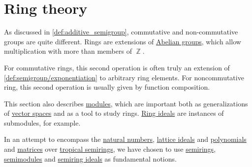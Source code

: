 \chapter{Ring theory}\label{ch:ring_theory}

As discussed in \cref{def:additive_semigroup}, commutative and non-commutative groups are quite different. Rings are extensions of \hyperref[def:abelian_group]{Abelian groups}, which allow multiplication with more than members of \( \BbbZ \).

For commutative rings, this second operation is often truly an extension of \cref{def:semigroup/exponentiation} to arbitrary ring elements. For noncommutative ring, this second operation is usually given by function composition.

This section also describes \hyperref[def:module]{modules}, which are important both as generalizations of \hyperref[def:vector_space]{vector spaces} and as a tool to study rings. \hyperref[def:semiring_ideal]{Ring ideals} are instances of submodules, for example.

In an attempt to encompass the \hyperref[def:natural_numbers]{natural numbers}, \hyperref[def:lattice_ideal]{lattice ideals} and \hyperref[def:polynomial_algebra]{polynomials} and \hyperref[def:array/matrix]{matrices} over \hyperref[def:tropical_semiring]{tropical semirings}, we have chosen to use \hyperref[def:semiring]{semirings}, \hyperref[def:semimodule]{semimodules} and \hyperref[def:semiring_ideal]{semiring ideals} as fundamental notions.

